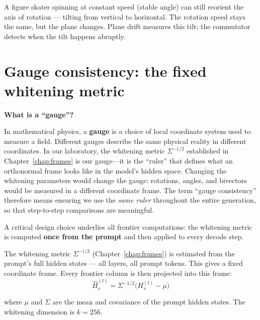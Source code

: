 \documentclass[11pt, twoside, openright]{memoir}
\numberwithin{equation}{chapter}
\begin{document}
\begin{analogy}
A figure skater spinning at constant speed (stable angle) can still
reorient the axis of rotation --- tilting from vertical to
horizontal.  The rotation speed stays the same, but the plane
changes.  Plane drift measures this tilt; the commutator detects
when the tilt happens abruptly.
\end{analogy}


\section{Gauge consistency: the fixed whitening metric}
\label{sec:frontier-gauge}

\begin{mathbox}
\textbf{What is a ``gauge''?}

In mathematical physics, a \textbf{gauge} is a choice of local
coordinate system used to measure a field.  Different gauges describe
the same physical reality in different coordinates.  In our
laboratory, the whitening metric $\Sigma^{-1/2}$ established in
Chapter~\ref{chap:frames} is our gauge---it is the ``ruler'' that
defines what an orthonormal frame looks like in the model's hidden
space.  Changing the whitening parameters would change the gauge:
rotations, angles, and bivectors would be measured in a different
coordinate frame.  The term ``gauge consistency'' therefore means
ensuring we use the \emph{same ruler} throughout the entire
generation, so that step-to-step comparisons are meaningful.
\end{mathbox}

A critical design choice underlies all frontier computations: the
whitening metric is computed \textbf{once from the prompt} and then
applied to every decode step.

\begin{keyidea}
The whitening metric $\Sigma^{-1/2}$ (Chapter~\ref{chap:frames})
is estimated from the prompt's full hidden states --- all layers,
all prompt tokens.  This gives a fixed coordinate frame.  Every
frontier column is then projected into this frame:
\begin{equation}
  \hat{H}^{(l)}_s = \Sigma^{-1/2}\bigl(H^{(l)}_s - \mu\bigr)
\end{equation}

where $\mu$ and $\Sigma$ are the mean and covariance of the
prompt hidden states.  The whitening dimension is $k = 256$.
\end{keyidea}
\end{document}
